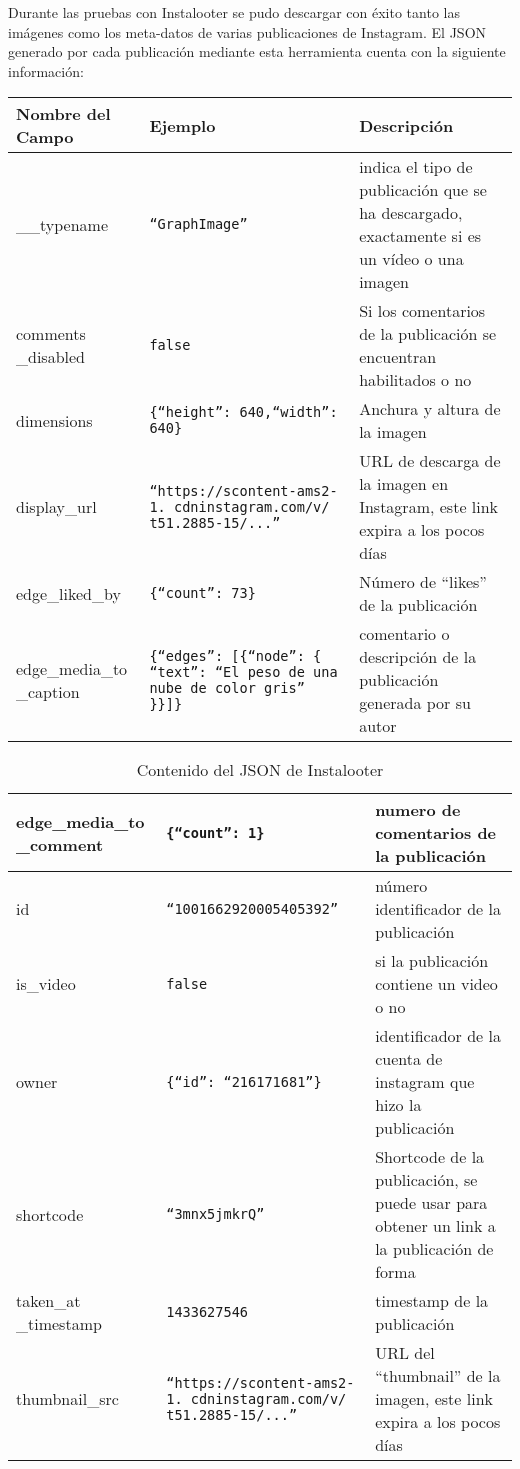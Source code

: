 Durante las pruebas con Instalooter se pudo descargar con éxito tanto las imágenes como los meta-datos de varias publicaciones de Instagram. El JSON generado por cada publicación mediante esta herramienta cuenta con la siguiente información:

\begin{table}[H]
    \centering
    \begin{tabular}{|p{}|p{}|p{}|}
    \hline
    Nombre del Campo & Ejemplo & Descripción \\ \hline
    \_\_typename & \texttt{``GraphImage''} & indica el tipo de publicación que se ha descargado, exactamente si es un vídeo o una imagen \\ \hline
    comments \_disabled & \texttt{false} & Si los comentarios de la publicación se encuentran habilitados o no \\ \hline
    dimensions & \texttt{\{``height'': 640,``width'': 640\}} & Anchura y altura de la imagen \\ \hline
    display\_url & \texttt{``https://scontent-ams2-1.
    cdninstagram.com/v/ t51.2885-15/...''} & URL de descarga de la imagen en Instagram, este link expira a los pocos días \\ \hline
    edge\_liked\_by & \texttt{\{``count'': 73\}} & Número de ``likes'' de la publicación \\ \hline
    edge\_media\_to \_caption & \texttt{\{``edges'': {[}\{``node'': \{ ``text'': ``El peso de una nube de color gris'' \}\}{]}\}} & comentario o descripción de la publicación generada por su autor \\ \hline
    \end{tabular}
\end{table}
\begin{table}[H]
    \centering
    \begin{tabular}{|p{}|p{}|p{}|}
    \hline
    edge\_media\_to \_comment & \texttt{\{``count'': 1\}} & numero de comentarios de la publicación \\ \hline
    id & \texttt{``1001662920005405392''} & número identificador de la publicación \\ \hline
    is\_video & \texttt{false} & si la publicación contiene un video o no \\ \hline
    owner & \texttt{\{``id'': ``216171681''\}} & identificador de la cuenta de instagram que hizo la publicación \\ \hline
    shortcode & \texttt{``3mnx5jmkrQ''} & Shortcode de la publicación, se puede usar para obtener un link a la publicación de forma \\ \hline
    taken\_at \_timestamp & \texttt{1433627546} & timestamp de la publicación \\ \hline
    thumbnail\_src & \texttt{``https://scontent-ams2-1.
    cdninstagram.com/v/ t51.2885-15/...'' }& URL del ``thumbnail'' de la imagen, este link expira a los pocos días \\ \hline
    \end{tabular}
    \caption{Contenido del JSON de Instalooter}
    \label{tab:json_instalooter}
\end{table}

